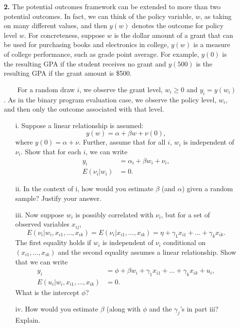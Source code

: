 \documentclass[a4paper]{ctexart}
\theoremstyle{remark}
\begin{document}
\begin{itemize}
\item[\textbf{2.}] The potential outcomes framework can be extended to more than two potential outcomes. In fact, we can think of the policy variable, $w$, as taking on many different values, and then $y(w)$ denotes the outcome for policy level $w$. For concreteness, suppose $w$ is the dollar amount of a grant that can be used for purchasing books and electronics in college, $y(w)$ is a measure of college performance, such as grade point average. For example, $y(0)$ is the resulting GPA if the student receives no grant and $y(500)$ is the resulting GPA if the grant amount is \$500.

~~~~For a random draw $i$, we observe the grant level, $w_i\geq 0$ and $y_i=y(w_i)$. As in the binary program evaluation case, we observe the policy level, $w_i$, and then only the outcome associated with that level.

\begin{enumerate}
\item[i.] Suppose a linear relationship is assumed:
\[y(w)=\alpha+\beta w+\nu(0),\]
where $y(0)=\alpha+\nu$. Further, assume that for all $i$, $w_i$ is independent of $\nu_i$. Show that for each $i$, we can write
\begin{align*}
y_i&=\alpha_i+\beta w_i+\nu_i,\\
E(\nu_i|w_i)&=0.
\end{align*}
\item[ii.] In the context of i, how would you estimate $\beta$ (and $\alpha$) given a random sample? Justify your answer. 
\item[iii.] Now suppose $w_i$ is possibly correlated with $\nu_i$, but for a set of observed variables $x_{ij}$,
\[E(\nu_i|w_i, x_{i1},...,x_{ik})=E(\nu_i|x_{i1},...,x_{ik})=\eta+\gamma_1 x_{i1}+...+\gamma_k x_{ik}.\]
The first equality holds if $w_i$ is independent of $\nu_i$ conditional on $(x_{i1},...,x_{ik})$ and the second equality assumes a linear relationship. Show that we can write
\begin{align*}
y_i&=\phi+\beta w_i+\gamma_1 x_{i1}+...+\gamma_k x_{ik}+u_i,\\
E(u_i|w_i, x_{i1},...,x_{ik})&=0.
\end{align*}
What is the intercept $\phi$?
\item[iv.]  How would you estimate $\beta$ (along with $\phi$ and the $\gamma_j$'s in part iii? Explain.
\end{enumerate}


\end{itemize}
\end{document}
